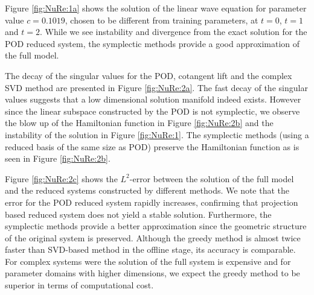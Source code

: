 Figure \ref{fig:NuRe:1a} shows the solution of the linear wave equation for parameter value $c=0.1019$, chosen to be different from training parameters, at $t=0$, $t = 1$ and $t=2$. While we see instability and divergence from the exact solution for the POD reduced system, the symplectic methods provide a good approximation of the full model. 

The decay of the singular values for the POD, cotangent lift and the complex SVD method are presented in Figure \ref{fig:NuRe:2a}. The fast decay of the singular values suggests that a low dimensional solution manifold indeed exists. However since the linear subspace constructed by the POD is not symplectic, we observe the blow up of the Hamiltonian function in Figure \ref{fig:NuRe:2b} and the instability of the solution in Figure \ref{fig:NuRe:1}. The symplectic methods (using a reduced basis of the same size as POD) preserve the Hamiltonian function as is seen in Figure \ref{fig:NuRe:2b}.

Figure \ref{fig:NuRe:2c} shows the $L^2$-error between the solution of the full model and the reduced systems constructed by different methods. We note that the error for the POD reduced system rapidly increases, confirming that projection based reduced system does not yield a stable solution. Furthermore, the symplectic methods provide a better approximation since the geometric structure of the original system is preserved. Although the greedy method is almost twice faster than SVD-based method in the offline stage, its accuracy is comparable. For complex systems were the solution of the full system is expensive and for parameter domains with higher dimensions, we expect the greedy method to be superior in terms of computational cost.






